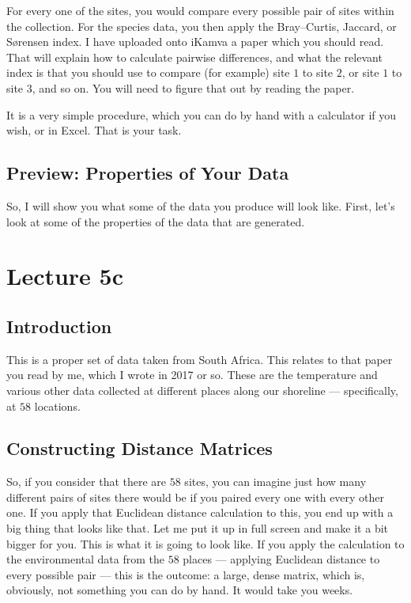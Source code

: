 \documentclass[
  11pt,
]{book}
\begin{document}
For every one of the sites, you would compare every possible pair of
sites within the collection. For the species data, you then apply the
Bray--Curtis, Jaccard, or Sørensen index. I have uploaded onto iKamva a
paper which you should read. That will explain how to calculate pairwise
differences, and what the relevant index is that you should use to
compare (for example) site \(1\) to site \(2\), or site \(1\) to site
\(3\), and so on. You will need to figure that out by reading the paper.

It is a very simple procedure, which you can do by hand with a
calculator if you wish, or in Excel. That is your task.

\section{Preview: Properties of Your
Data}\label{preview-properties-of-your-data}

So, I will show you what some of the data you produce will look like.
First, let's look at some of the properties of the data that are
generated.

\chapter*{Lecture 5c}\label{lecture-5c}

\section{Introduction}\label{introduction-1}

This is a proper set of data taken from South Africa. This relates to
that paper you read by me, which I wrote in 2017 or so. These are the
temperature and various other data collected at different places along
our shoreline --- specifically, at \(58\) locations.

\section{Constructing Distance
Matrices}\label{constructing-distance-matrices}

So, if you consider that there are \(58\) sites, you can imagine just
how many different pairs of sites there would be if you paired every one
with every other one. If you apply that Euclidean distance calculation
to this, you end up with a big thing that looks like that. Let me put it
up in full screen and make it a bit bigger for you. This is what it is
going to look like. If you apply the calculation to the environmental
data from the \(58\) places --- applying Euclidean distance to every
possible pair --- this is the outcome: a large, dense matrix, which is,
obviously, not something you can do by hand. It would take you weeks.
\end{document}

